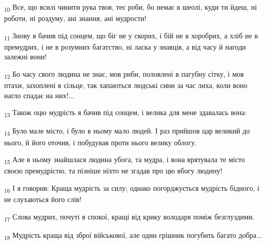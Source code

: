 \begin{tcolorbox}
\textsubscript{10} Все, що всилі чинити рука твоя, теє роби, бо немає в шеолі, куди ти йдеш, ні роботи, ні роздуму, ані знання, ані мудрости!
\end{tcolorbox}
\begin{tcolorbox}
\textsubscript{11} Знову я бачив під сонцем, що біг не у скорих, і бій не в хоробрих, а хліб не в премудрих, і не в розумних багатство, ні ласка у знавців, а від часу й нагоди залежні вони!
\end{tcolorbox}
\begin{tcolorbox}
\textsubscript{12} Бо часу свого людина не знає, мов риби, половлені в пагубну сітку, і мов птахи, захоплені в сільце, так хапаються людські сини за час лиха, коли воно нагло спадає на них!...
\end{tcolorbox}
\begin{tcolorbox}
\textsubscript{13} Також оцю мудрість я бачив під сонцем, і велика для мене здавалась вона:
\end{tcolorbox}
\begin{tcolorbox}
\textsubscript{14} Було мале місто, і було в ньому мало людей. І раз прийшов цар великий до нього, й його оточив, і побудував проти нього велику облогу.
\end{tcolorbox}
\begin{tcolorbox}
\textsubscript{15} Але в ньому знайшлася людина убога, та мудра, і вона врятувала те місто своєю премудрістю, та пізніше ніхто не згадав про цю вбогу людину!
\end{tcolorbox}
\begin{tcolorbox}
\textsubscript{16} І я говорив: Краща мудрість за силу; однако погорджується мудрість бідного, і не слухаються його слів!
\end{tcolorbox}
\begin{tcolorbox}
\textsubscript{17} Слова мудрих, почуті в спокої, кращі від крику володаря поміж безглуздими.
\end{tcolorbox}
\begin{tcolorbox}
\textsubscript{18} Мудрість краща від зброї військової, але один грішник погубить багато добра...
\end{tcolorbox}
